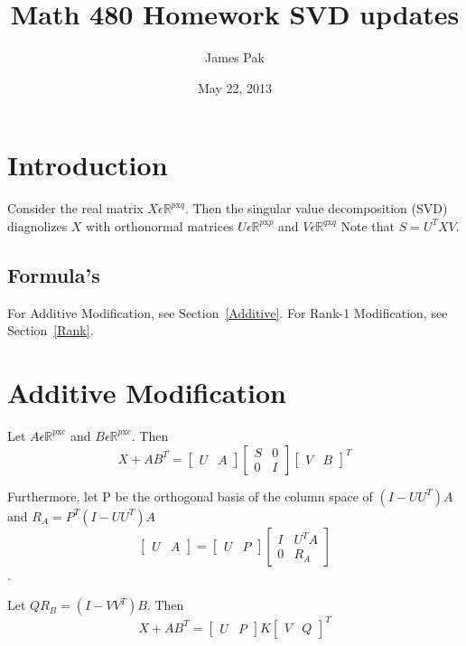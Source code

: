 \documentclass{article}
\begin{document}
\title{Math 480 Homework SVD updates}
\author{James Pak}
\date{May 22, 2013}
\maketitle


\section{Introduction\label{intro}}
Consider the real matrix $X\label{X}{\epsilon}{\mathbb{R}^{p\mathrm{x}q}}$.
Then the singular value decomposition (SVD) diagnolizes $X$ with orthonormal matrices $U \epsilon \mathbb{R}^{p\mathrm{x}p}$ and $V \epsilon \mathbb{R}^{q\mathrm{x}q}$
Note that $S=U^TXV$.

\subsection{Formula's\label{forumlas}}
For Additive Modification, see Section~\ref{Additive}.
For Rank-1 Modification, see Section~\ref{Rank}.

\section{Additive Modification\label{Additive}}
Let $A \epsilon \mathbb{R}^{p\mathrm{x}c}$ and $B \epsilon \mathbb{R}^{p\mathrm{x}c}$. Then
$$
X + AB^T =
\begin{bmatrix}
U & A
\end{bmatrix}
\begin{bmatrix}
S & 0 \\
0 & I
\end{bmatrix}
\begin{bmatrix}
V & B
\end{bmatrix}^T
$$

Furthermore, let P be the orthogonal basis of the column space of $(I-UU^T)A$ and $R_A=P^T(I-UU^T)A$
$$
\begin{bmatrix}
U & A
\end{bmatrix}
=
\begin{bmatrix}
U & P
\end{bmatrix}
\begin{bmatrix}
I & U^TA \\
0 & R_A
\end{bmatrix}
$$.

Let $QR_B=(I-VV^T)B$. Then
$$
X+AB^T =
\begin{bmatrix}
U & P
\end{bmatrix}
K
\begin{bmatrix}
V & Q
\end{bmatrix}^T
$$
\end{document}
